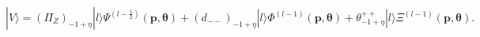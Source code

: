 \begin{equation}
 |V\rangle=(\Pi_Z)_{-1+\eta}|l\rangle
\Psi^{(l-\frac{1}{2})}(\boldsymbol p,\boldsymbol\theta)
+(d_{--})_{-1+\eta}|l\rangle\Phi^{(l-1)}(\boldsymbol p,\boldsymbol\theta)
+\theta^{++}_{-1+\eta}|l\rangle\Xi^{(l-1)}(\boldsymbol p,\boldsymbol\theta).
\end{equation}

